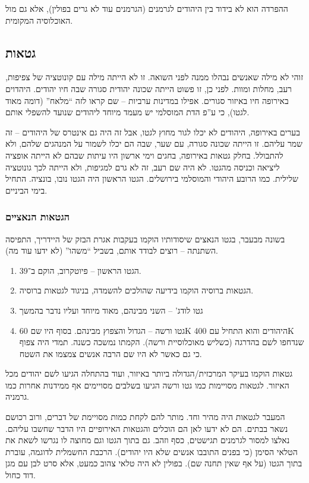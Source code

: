 \documentclass[]{article}
\begin{document}
    ההפרדה הוא לא בידוד בין היהודים לגרמנים (הגרמנים עוד לא גרים בפולין), אלא גם מול האוכלוסיה המקומית. 
    
    \subsection{גטאות}
    זוהי לא מילה שאנשים נבהלו ממנה לפני השואה. זו לא הייתה מילה עם קונוטציה של צפיפות, רעב, מחלות ומוות. לפני כן, זו פשוט הייתה שכונה יהודית סגורה שבה חיו יהודים. היהדוים באירופה חיו באיזור סגורים. אפילו במדינות ערביות – שם קראו לזה ``מלאח'' (דומה מאוד לגטו), כי ע''פ הדת המוסלמי יש מעמד מיוחד ליהודים שנועד להשפלי אותם. 
    
    בערים באירופה, היהודים לא יכלו לגור מחוץ לגטו, אבל זה היה גם אינטרס של היהודים – זה שמר עליהם. זו הייתה שכונה סגורה, עם שער, שבה הם יכלו לשמור על המנהגים שלהם, ולא להתבולל. בחלק גטאות באירופה, בחגים וימי ארשון היו עיתות שבהם לא הייתה אופציה ליציאה וכניסה מהגטו. לא היה שם רעב, זה לא גרם למגיפות, ולא הייתה לכך גונוטציה שלילית. כמו הרובע היהודי והמוסלמי בירושלים. הגטו הראשון היה הגטו נובו, בונציה. התחיל בימי הביניים. 
    
    \subsubsection{הגטאות הנאציים}
    בשונה מבעבר, בגטו הנאצים שיסודותיו הוקמו בעקבות אגרת הבזק של היידריך, התפיסה השתנתה – רוצים לבודד אותם, בשביל ``משהו'' (לא ידעו עוד מה). 
    
    \begin{enumerate}
        \item הגטו הראשון – פיוטקרוב, הוקם ב־39. 
        \item הגטאות ברוסיה הוקמו בידיעה שהולכים להשמדה, בניגוד לגטאות ברוסיה. 
        \item גטו לודג' – השני מבינהם, מאוד מיוחד ועליו נדבר בהמשך
        \item גטו ורשה – הגדול והצפוץ מבינהם. בסוף היו שם 60K היהודים והוא התחיל עם 400K שנדחפו לשם בהדרגה (כשליש מאוכלוסיית ורשה). הקמתו נמשכה כשנה. תמדי היה צפוף כי גם כאשר לא היו שם הרבה אנשים צמצמו את השטח. 
    \end{enumerate}
    
    גטאות הוקמו בעיקר המרכזית/הגדולה ביותר באיזור, ועוד בהתחלה הגיעו לשם יהודים מכל האיזור. לגטאות מסויימות כמו גטו ורשה הגיעו בשלבים מסויימים אף ממידנות אחרות כמו גרמניה. 
    
    המעבר לגטאות היה מהיר וחד. מותר להם לקחת כמות מסויימת של דברים, ורוב רכושם נשאר בבתים. הם לא ידעו לאן הם הוכלים והגטאות האירופיים היו הדבר שחשבו עליהם. נאלצו למסור לגרמנים תגישטים, כסף וזהב. גם בתוך הגטו וגם מחוצה לו נגרשו לשאת את הטלאי הסימן (כי בפנים התובבו אנשים שלא היו יהודים). הרכבת החשמלית לדוגמה, עוברת בתוך הגטו (על אף שאין תחנה שם). בפולין לא היה טלאי צהוב כמעט, אלא סרט לבן עם מגן דוד כחול. 
    
\end{document}
